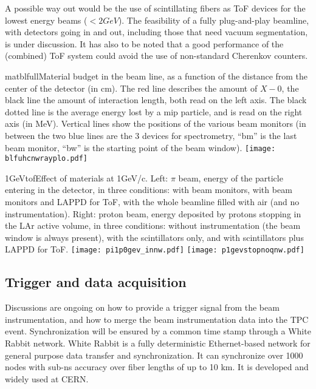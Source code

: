 A possible way out would be the use of scintillating fibers as ToF devices for the lowest energy beams ($< 2 GeV$). 
 The feasibility of a fully plug-and-play beamline, with detectors going in and out, including those that need vacuum segmentation, is under discussion. 
 It has also to be noted that a good performance of the (combined) ToF system could avoid the use of non-standard Cherenkov counters.
 \begin{cdrfigure}{matblfull}{Material budget in the beam line, as a function of the distance from the center of the detector (in cm). The red line describes the amount of $X-0$, the black line the amount of interaction length, both read on the left axis. The black dotted line is the average energy lost by a mip particle, and is read on the right axis (in MeV). Vertical lines show the positions of the various beam monitors (in between the two blue lines are the 3 devices for spectrometry, ``bm'' is the last beam monitor, ``bw'' is the starting point of the beam window).}  
\texttt{[image: blfuhcnwrayplo.pdf]}
\end{cdrfigure}
%
 \begin{cdrfigure}{1GeVtof}{Effect of materials at  1GeV/c. Left: $\pi$ beam, energy of the particle entering in the detector, in three conditions: with  beam monitors, with beam monitors and LAPPD for ToF, with the whole beamline filled with air (and no instrumentation). Right: proton beam, energy deposited by protons stopping in the LAr active volume, in three conditions: without instrumentation (the beam window is always present), with the scintillators only, and with scintillators plus LAPPD for ToF.  }
\texttt{[image: pi1p0gev\_innw.pdf]}
\texttt{[image: p1gevstopnoqnw.pdf]}
\end{cdrfigure}

\subsection {Trigger and data acquisition}
Discussions are ongoing 
on how to provide a trigger signal from the beam instrumentation, and how to merge the beam instrumentation data into the TPC event. Synchronization will be ensured by a common time stamp through a White Rabbit network.
 White Rabbit is a fully deterministic Ethernet-based network for general purpose data transfer and synchronization. It can synchronize over 1000 nodes with sub-ns accuracy over fiber lengths of up to 10 km. It is developed and widely used at CERN.
